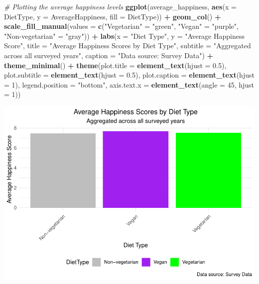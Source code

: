 \documentclass[
]{article}
\newenvironment{Shaded}{\begin{snugshade}}{\end{snugshade}}
\newcommand{\AttributeTok}[1]{\textcolor[rgb]{0.13,0.29,0.53}{#1}}
\newcommand{\CommentTok}[1]{\textcolor[rgb]{0.56,0.35,0.01}{\textit{#1}}}
\newcommand{\DecValTok}[1]{\textcolor[rgb]{0.00,0.00,0.81}{#1}}
\newcommand{\FloatTok}[1]{\textcolor[rgb]{0.00,0.00,0.81}{#1}}
\newcommand{\FunctionTok}[1]{\textcolor[rgb]{0.13,0.29,0.53}{\textbf{#1}}}
\newcommand{\NormalTok}[1]{#1}
\newcommand{\OtherTok}[1]{\textcolor[rgb]{0.56,0.35,0.01}{#1}}
\newcommand{\SpecialCharTok}[1]{\textcolor[rgb]{0.81,0.36,0.00}{\textbf{#1}}}
\newcommand{\StringTok}[1]{\textcolor[rgb]{0.31,0.60,0.02}{#1}}
\begin{document}
\begin{Shaded}
\begin{Highlighting}[]
\CommentTok{\# Plotting the average happiness levels}
\FunctionTok{ggplot}\NormalTok{(average\_happiness, }\FunctionTok{aes}\NormalTok{(}\AttributeTok{x =}\NormalTok{ DietType, }\AttributeTok{y =}\NormalTok{ AverageHappiness, }\AttributeTok{fill =}\NormalTok{ DietType)) }\SpecialCharTok{+}
  \FunctionTok{geom\_col}\NormalTok{() }\SpecialCharTok{+}
  \FunctionTok{scale\_fill\_manual}\NormalTok{(}\AttributeTok{values =} \FunctionTok{c}\NormalTok{(}\StringTok{"Vegetarian"} \OtherTok{=} \StringTok{"green"}\NormalTok{, }\StringTok{"Vegan"} \OtherTok{=} \StringTok{"purple"}\NormalTok{, }\StringTok{"Non{-}vegetarian"} \OtherTok{=} \StringTok{"gray"}\NormalTok{)) }\SpecialCharTok{+}
  \FunctionTok{labs}\NormalTok{(}\AttributeTok{x =} \StringTok{"Diet Type"}\NormalTok{, }\AttributeTok{y =} \StringTok{"Average Happiness Score"}\NormalTok{,}
       \AttributeTok{title =} \StringTok{"Average Happiness Scores by Diet Type"}\NormalTok{,}
       \AttributeTok{subtitle =} \StringTok{"Aggregated across all surveyed years"}\NormalTok{,}
       \AttributeTok{caption =} \StringTok{"Data source: Survey Data"}\NormalTok{) }\SpecialCharTok{+}
  \FunctionTok{theme\_minimal}\NormalTok{() }\SpecialCharTok{+}
  \FunctionTok{theme}\NormalTok{(}\AttributeTok{plot.title =} \FunctionTok{element\_text}\NormalTok{(}\AttributeTok{hjust =} \FloatTok{0.5}\NormalTok{),}
        \AttributeTok{plot.subtitle =} \FunctionTok{element\_text}\NormalTok{(}\AttributeTok{hjust =} \FloatTok{0.5}\NormalTok{),}
        \AttributeTok{plot.caption =} \FunctionTok{element\_text}\NormalTok{(}\AttributeTok{hjust =} \DecValTok{1}\NormalTok{),}
        \AttributeTok{legend.position =} \StringTok{"bottom"}\NormalTok{,}
        \AttributeTok{axis.text.x =} \FunctionTok{element\_text}\NormalTok{(}\AttributeTok{angle =} \DecValTok{45}\NormalTok{, }\AttributeTok{hjust =} \DecValTok{1}\NormalTok{))}
\end{Highlighting}
\end{Shaded}

\includegraphics{Final-v2_files/figure-latex/Fin-1.pdf}
\end{document}
